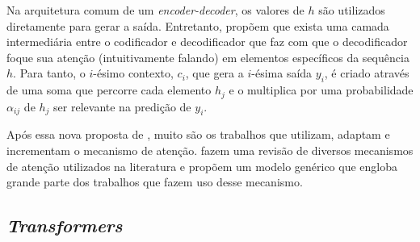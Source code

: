 Na arquitetura comum de um \textit{encoder-decoder}, os valores de $h$ são
utilizados diretamente para gerar a saída. Entretanto,
\cite{bahdanau-etal:2014:attention-mechanism} propõem que exista uma camada
intermediária entre o codificador e decodificador que faz com que o
decodificador foque sua atenção (intuitivamente falando) em elementos
específicos da sequência $h$. Para tanto, o $i$-ésimo contexto, $c_i$, que
gera a $i$-ésima saída $y_i$, é criado através de uma soma que percorre cada
elemento $h_j$ e o multiplica por uma probabilidade $\alpha_{ij}$ de $h_j$ ser
relevante na predição de $y_i$.

Após essa nova proposta de \cite{bahdanau-etal:2014:attention-mechanism}, muito
são os trabalhos que utilizam, adaptam e incrementam o mecanismo de atenção.
\cite{galassi:2021:attention-in-nlp} fazem uma revisão de diversos mecanismos de
atenção utilizados na literatura e propõem um modelo genérico que engloba grande
parte dos trabalhos que fazem uso desse mecanismo.

\subsection{\textit{Transformers}}%
\label{sub:transformers}


